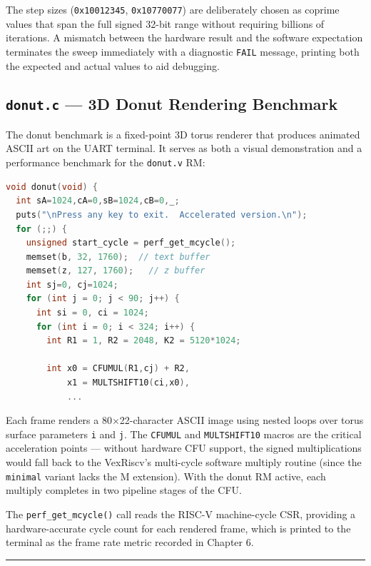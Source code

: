 The step sizes (\texttt{0x10012345}, \texttt{0x10770077}) are deliberately chosen as coprime values that span the full signed 32-bit range without requiring billions of iterations. A mismatch between the hardware result and the software expectation terminates the sweep immediately with a diagnostic \texttt{FAIL} message, printing both the expected and actual values to aid debugging.

\subsection{\texttt{donut.c} — 3D Donut Rendering Benchmark}

The donut benchmark is a fixed-point 3D torus renderer that produces animated ASCII art on the UART terminal. It serves as both a visual demonstration and a performance benchmark for the \texttt{donut.v} RM:

\begin{lstlisting}[style=mystyle, language=C]
void donut(void) {
  int sA=1024,cA=0,sB=1024,cB=0,_;
  puts("\nPress any key to exit.  Accelerated version.\n");
  for (;;) {
    unsigned start_cycle = perf_get_mcycle();
    memset(b, 32, 1760);  // text buffer
    memset(z, 127, 1760);   // z buffer
    int sj=0, cj=1024;
    for (int j = 0; j < 90; j++) {
      int si = 0, ci = 1024;
      for (int i = 0; i < 324; i++) {
        int R1 = 1, R2 = 2048, K2 = 5120*1024;

        int x0 = CFUMUL(R1,cj) + R2,
            x1 = MULTSHIFT10(ci,x0),
            ...
\end{lstlisting}

Each frame renders a 80×22-character ASCII image using nested loops over torus surface parameters \texttt{i} and \texttt{j}. The \texttt{CFUMUL} and \texttt{MULTSHIFT10} macros are the critical acceleration points — without hardware CFU support, the signed multiplications would fall back to the VexRiscv's multi-cycle software multiply routine (since the \texttt{minimal} variant lacks the M extension). With the donut RM active, each multiply completes in two pipeline stages of the CFU.

The \texttt{perf\_get\_mcycle()} call reads the RISC-V machine-cycle CSR, providing a hardware-accurate cycle count for each rendered frame, which is printed to the terminal as the frame rate metric recorded in Chapter 6.

\vspace{0.4em}\hrule\vspace{0.4em}

